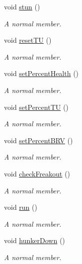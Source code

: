 \begin{DoxyCompactItemize}
void \hyperlink{class_a_unit2_d_aa98e4af27fd175f81fc9761e4b139caf}{stun} ()
\begin{DoxyCompactList}\small\item\em A normal member. \end{DoxyCompactList}\item 
void \hyperlink{class_a_unit2_d_a141b33f9f1c9409e645960903ccb714f}{reset\+TU} ()
\begin{DoxyCompactList}\small\item\em A normal member. \end{DoxyCompactList}\item 
void \hyperlink{class_a_unit2_d_af13c789a87a18daa455387f44d84d333}{set\+Percent\+Health} ()
\begin{DoxyCompactList}\small\item\em A normal member. \end{DoxyCompactList}\item 
void \hyperlink{class_a_unit2_d_a0f93d2f4547813149e5b46530dcaba67}{set\+Percent\+TU} ()
\begin{DoxyCompactList}\small\item\em A normal member. \end{DoxyCompactList}\item 
void \hyperlink{class_a_unit2_d_a30c4c53f8789064bb9fc7b7d8703ae35}{set\+Percent\+B\+RV} ()
\begin{DoxyCompactList}\small\item\em A normal member. \end{DoxyCompactList}\item 
void \hyperlink{class_a_unit2_d_ae1d7c09760d899ca25e96a9573b2ddf0}{check\+Freakout} ()
\begin{DoxyCompactList}\small\item\em A normal member. \end{DoxyCompactList}\item 
void \hyperlink{class_a_unit2_d_aa0a382d42b3024c460e549054b158803}{run} ()
\begin{DoxyCompactList}\small\item\em A normal member. \end{DoxyCompactList}\item 
void \hyperlink{class_a_unit2_d_ae1e36f7fa10bf392c4ceb150fd6addc8}{hunker\+Down} ()
\begin{DoxyCompactList}\small\item\em A normal member. \end{DoxyCompactList}\end{DoxyCompactItemize}
